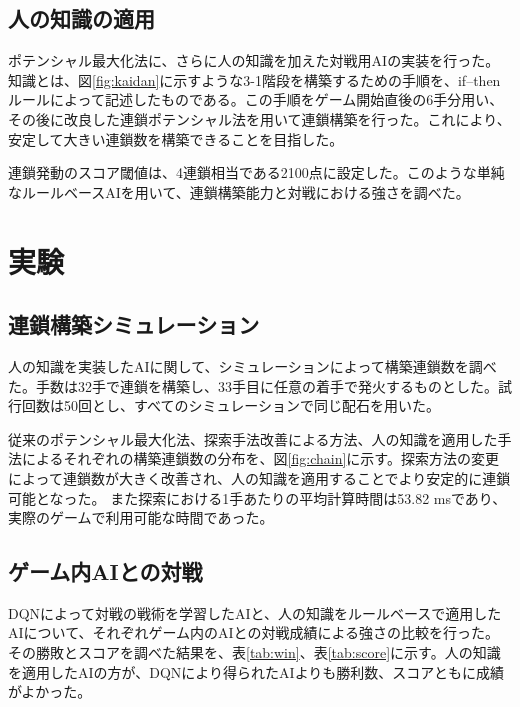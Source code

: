 \documentclass[twocolumn, a4paper]{UECIEresume}
\begin{document}
\subsection{人の知識の適用}
ポテンシャル最大化法に、さらに人の知識を加えた対戦用AIの実装を行った。知識とは、図\ref{fig:kaidan}に示すような3-1階段を構築するための手順を、if--thenルールによって記述したものである。この手順をゲーム開始直後の6手分用い、その後に改良した連鎖ポテンシャル法を用いて連鎖構築を行った。これにより、安定して大きい連鎖数を構築できることを目指した。

連鎖発動のスコア閾値は、4連鎖相当である2100点に設定した。このような単純なルールベースAIを用いて、連鎖構築能力と対戦における強さを調べた。



\section{実験}
\subsection{連鎖構築シミュレーション}
人の知識を実装したAIに関して、シミュレーションによって構築連鎖数を調べた。手数は32手で連鎖を構築し、33手目に任意の着手で発火するものとした。試行回数は50回とし、すべてのシミュレーションで同じ配石を用いた。

従来のポテンシャル最大化法、探索手法改善による方法、人の知識を適用した手法によるそれぞれの構築連鎖数の分布を、図\ref{fig:chain}に示す。探索方法の変更によって連鎖数が大きく改善され、人の知識を適用することでより安定的に連鎖可能となった。%
また探索における1手あたりの平均計算時間は53.82 msであり、実際のゲームで利用可能な時間であった。

\subsection{ゲーム内AIとの対戦}
DQNによって対戦の戦術を学習したAIと、人の知識をルールベースで適用したAIについて、それぞれゲーム内のAIとの対戦成績による強さの比較を行った。その勝敗とスコアを調べた結果を、表\ref{tab:win}、表\ref{tab:score}に示す。人の知識を適用したAIの方が、DQNにより得られたAIよりも勝利数、スコアともに成績がよかった。

%
\end{document}
